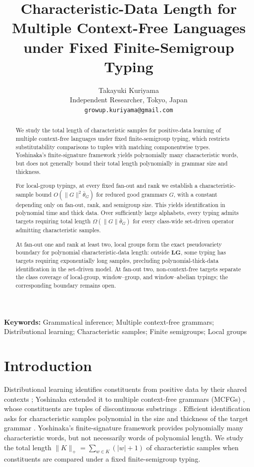 \documentclass[11pt]{article}
\title{Characteristic-Data Length for Multiple Context-Free Languages
under Fixed Finite-Semigroup Typing}
\author{Takayuki Kuriyama\\
Independent Researcher, Tokyo, Japan\\
\texttt{growup.kuriyama@gmail.com}}
\date{}
\numberwithin{equation}{section}
\theoremstyle{plain}
\theoremstyle{definition}
\theoremstyle{remark}
\theoremstyle{plain}
\begin{document}
\maketitle

\begin{abstract}
We study the total length of characteristic samples for positive-data learning
of multiple context-free languages under fixed finite-semigroup typing, which
restricts substitutability comparisons to tuples with matching componentwise
types. Yoshinaka's finite-signature framework yields polynomially many
characteristic words, but does not generally bound their total length
polynomially in grammar size and thickness.

For local-group typings, at every fixed fan-out and rank we establish a
characteristic-sample bound $O(\|G\|^2\bar\theta_G)$ for reduced good grammars
$G$, with a constant depending only on fan-out, rank, and semigroup size.
This yields identification in polynomial time and thick data. Over sufficiently
large alphabets, every typing admits targets requiring total length
$\Omega(\|G\|\bar\theta_G)$ for every class-wide set-driven operator
admitting characteristic samples.

At fan-out one and rank at least two, local groups form the exact
pseudovariety boundary for polynomial characteristic-data length: outside
$\mathbf{LG}$, some typing has targets requiring exponentially long samples,
precluding polynomial-thick-data identification in the set-driven model.
At fan-out two, non-context-free targets separate the class coverage of
local-group, window--group, and window--abelian typings; the corresponding
boundary remains open.
\end{abstract}

\noindent\textbf{Keywords:} Grammatical inference; Multiple context-free
grammars; Distributional learning; Characteristic samples; Finite
semigroups; Local groups
\par\medskip

\section{Introduction}
\label{sec:introduction}

Distributional learning identifies constituents from positive data by their
shared contexts \cite{Gold1967,Angluin1980,ClarkEyraud2007}; Yoshinaka
extended it to multiple context-free grammars (MCFGs) \cite{SekiEtAl1991},
whose constituents are tuples of discontinuous substrings
\cite{Yoshinaka2009,Yoshinaka2011}.  Efficient identification asks for
characteristic samples polynomial in the size and thickness of the target
grammar \cite{Yoshinaka2008,EyraudHeinzYoshinaka2016}.  Yoshinaka's
finite-signature framework \cite{Yoshinaka2015General} provides polynomially
many characteristic words, but not necessarily words of polynomial length.  We study the
total length $\|K\|_+=\sum_{w\in K}(|w|+1)$ of characteristic samples when
constituents are compared under a fixed finite-semigroup typing.
\end{document}
